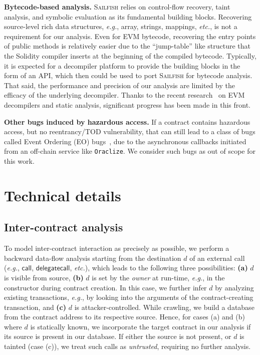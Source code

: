 \documentclass[conference, romanappendices]{tex/IEEEtran}
\theoremstyle{bfnote}
\newcommand{\toolname}{\textsc{Sailfish}\xspace}
\newcommand{\solidity}{{\sc Solidity}\xspace}
\newcommand{\haz}{{hazardous access}\xspace}
\newcommand{\etc}{\textit{etc.}}
\newcommand{\eg}{\textit{e.g.}}
\begin{document}
\noindent
\textbf{Bytecode-based analysis.}
\toolname relies on control-flow recovery, taint analysis, and symbolic evaluation as its fundamental building blocks.
Recovering source-level rich data structures, \eg, array, strings, mappings, \etc, is not a requirement for our analysis.
Even for {EVM\EndAccSupp{}} bytecode, recovering the entry points of public methods is relatively easier due to the ``jump-table'' like structure that the \solidity compiler inserts at the beginning of the compiled bytecode.
Typically, it is expected for a decompiler platform to provide the building blocks in the form of an API, which then could be used to port \toolname for bytecode analysis.
That said, the performance and precision of our analysis are limited by the efficacy of the underlying decompiler.
Thanks to the recent research~\cite{rattle-repo,gigahorse,panoramix-repo,Lagouvardos20} on {EVM\EndAccSupp{}} decompilers and static analysis, significant progress has been made in this front.

\noindent
\textbf{Other bugs induced by \haz.}
If a contract contains hazardous access, but no reentrancy/TOD vulnerability, that can still lead to a class of bugs called Event Ordering (EO) bugs~\cite{ethracer}, due to the asynchronous callbacks initiated from an off-chain service like \texttt{Oraclize}.
We consider such bugs as out of scope for this work.

\section{Technical details}
\label{app:technical_details}

\subsection{Inter-contract analysis}
\label{app:inter_contract_analysis}
To model inter-contract interaction as precisely as possible, we perform a backward data-flow analysis starting from the destination $d$ of an external call (\eg, $\mathsf{call}$, $\mathsf{delegatecall}$, \etc), which leads to the following three possibilities:
\textbf{(a)} $d$ is visible from source,
\textbf{(b)} $d$ is set by the \textit{owner} at run-time, \eg, in the constructor during contract creation.
In this case, we further infer $d$ by analyzing existing transactions, \eg, by looking into the arguments of the contract-creating transaction, and
\textbf{(c)} $d$ is attacker-controlled.
While crawling, we build a database from the contract address to its respective source.
Hence, for cases (a) and (b) where $d$ is statically known, we incorporate the target contract in our analysis if its source is present in our database.
If either the source is not present, or $d$ is tainted (case (c)), we treat such calls as \textit{untrusted}, requiring no further analysis.
\end{document}
